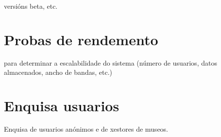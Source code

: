 versións beta, etc.

\section{Probas de rendemento}

para determinar a escalabilidade do sistema (número de usuarios, datos almacenados, ancho de bandas, etc.)


\section{Enquisa usuarios}

Enquisa de usuarios anónimos e de xestores de museos.
